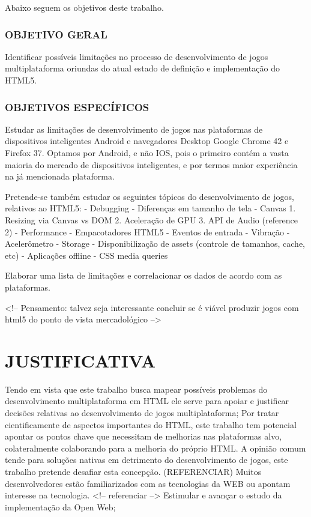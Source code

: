 \documentclass[11pt,a4paper]{article}
\begin{document}
Abaixo seguem os objetivos deste trabalho.

\subsection{  OBJETIVO GERAL}

Identificar possíveis limitações no processo de desenvolvimento de jogos multiplataforma oriundas do atual estado de definição e implementação do HTML5.

\subsection{  OBJETIVOS ESPECÍFICOS}

Estudar as limitações de desenvolvimento de jogos nas plataformas de dispositivos inteligentes Android e navegadores Desktop Google Chrome 42 e Firefox 37. Optamos por Android, e não IOS, pois o primeiro contém a vasta maioria do mercado de dispositivos inteligentes, e por termos maior experiência na já mencionada plataforma.

Pretende-se também estudar os seguintes tópicos do desenvolvimento de jogos, relativos ao HTML5:
- Debugging
- Diferenças em tamanho de tela
- Canvas
1. Resizing via Canvas vs DOM
2. Aceleração de GPU
3. API de Audio (reference 2)
- Performance
- Empacotadores HTML5
- Eventos de entrada
- Vibração
- Acelerômetro
- Storage
- Disponibilização de assets (controle de tamanhos, cache, etc)
- Aplicações offline
- CSS media queries

Elaborar uma lista de limitações e correlacionar os dados de acordo com as plataformas.

<!-- Pensamento: talvez seja interessante concluir se é viável produzir jogos com html5 do ponto de vista mercadológico -->

\chapter{JUSTIFICATIVA}

Tendo em vista que este trabalho busca mapear possíveis problemas do desenvolvimento multiplataforma em HTML ele serve para apoiar e justificar decisões relativas ao desenvolvimento de jogos multiplataforma;
Por tratar cientificamente de aspectos importantes do HTML, este trabalho tem potencial apontar os pontos chave que necessitam de melhorias nas plataformas alvo, colateralmente colaborando para a melhoria do próprio HTML.
A opinião comum tende para soluções nativas em detrimento do desenvolvimento de jogos, este trabalho pretende desafiar esta concepção. (REFERENCIAR)
Muitos desenvolvedores estão familiarizados com as tecnologias da WEB ou apontam interesse na tecnologia. <!-- referenciar -->
Estimular e avançar o estudo da implementação da Open Web;
\end{document}
